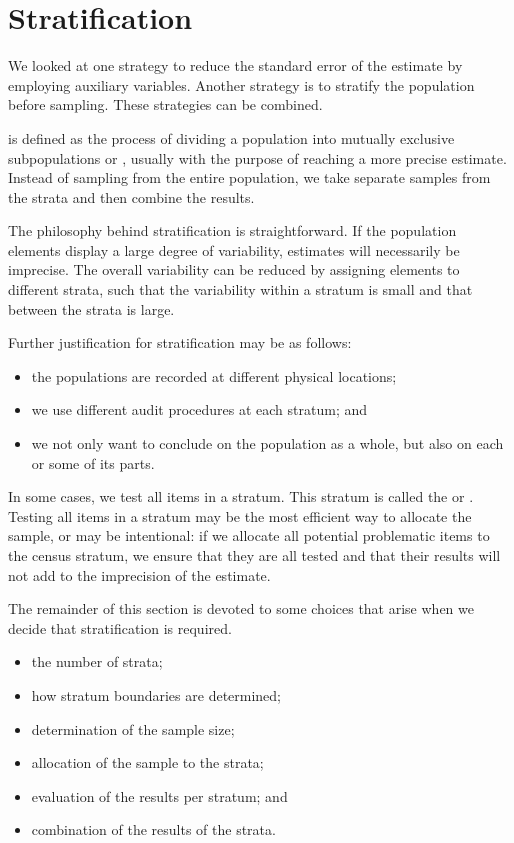 \section{Stratification} %
\label{sec:stratification}

We looked at one strategy to reduce the standard error of the estimate by employing auxiliary variables. Another strategy is to stratify the population before sampling. These strategies can be combined.

 is defined as the process of dividing a population into mutually exclusive subpopulations or , usually with the purpose of reaching a more precise estimate. Instead of sampling from the entire population, we take separate samples from the strata and then combine the results.

The philosophy behind stratification is straightforward. If the population elements display a large degree of variability, estimates will necessarily be imprecise. The overall variability can be reduced by assigning elements to different strata, such that the variability within a stratum is small and that between the strata is large.

\bigskip
Further justification for stratification may be as follows:
\begin{itemize}
\item the populations are recorded at different physical locations;
\item we use different audit procedures at each stratum; and
\item we not only want to conclude on the population as a whole, but also on each or some of its parts.
\end{itemize}

\bigskip
In some cases, we test all items in a stratum. This stratum is called the  or . 
Testing all items in a stratum may be the most efficient way to allocate the sample, or may be intentional: if we allocate all potential problematic items to the census stratum, we ensure that they are all tested and that their results will not add to the imprecision of the estimate.

\bigskip
The remainder of this section is devoted to some choices that arise when we decide that stratification is required.
\begin{itemize}
\item the number of strata;
\item how stratum boundaries are determined;
\item determination of the sample size;
\item allocation of the sample to the strata;
\item evaluation of the results per stratum; and
\item combination of the results of the strata.
\end{itemize}

